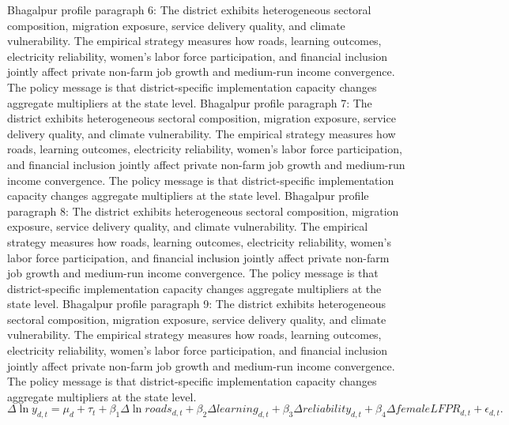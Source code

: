 \documentclass[preprint,12pt]{elsarticle}
\begin{document}
Bhagalpur profile paragraph 6: The district exhibits heterogeneous sectoral composition, migration exposure, service delivery quality, and climate vulnerability. The empirical strategy measures how roads, learning outcomes, electricity reliability, women's labor force participation, and financial inclusion jointly affect private non-farm job growth and medium-run income convergence. The policy message is that district-specific implementation capacity changes aggregate multipliers at the state level.
Bhagalpur profile paragraph 7: The district exhibits heterogeneous sectoral composition, migration exposure, service delivery quality, and climate vulnerability. The empirical strategy measures how roads, learning outcomes, electricity reliability, women's labor force participation, and financial inclusion jointly affect private non-farm job growth and medium-run income convergence. The policy message is that district-specific implementation capacity changes aggregate multipliers at the state level.
Bhagalpur profile paragraph 8: The district exhibits heterogeneous sectoral composition, migration exposure, service delivery quality, and climate vulnerability. The empirical strategy measures how roads, learning outcomes, electricity reliability, women's labor force participation, and financial inclusion jointly affect private non-farm job growth and medium-run income convergence. The policy message is that district-specific implementation capacity changes aggregate multipliers at the state level.
Bhagalpur profile paragraph 9: The district exhibits heterogeneous sectoral composition, migration exposure, service delivery quality, and climate vulnerability. The empirical strategy measures how roads, learning outcomes, electricity reliability, women's labor force participation, and financial inclusion jointly affect private non-farm job growth and medium-run income convergence. The policy message is that district-specific implementation capacity changes aggregate multipliers at the state level.
\begin{equation}\Delta \ln y_{d,t}=\mu_d+\tau_t+\beta_1\Delta\ln roads_{d,t}+\beta_2\Delta learning_{d,t}+\beta_3\Delta reliability_{d,t}+\beta_4\Delta femaleLFPR_{d,t}+\epsilon_{d,t}.\end{equation}
\end{document}
